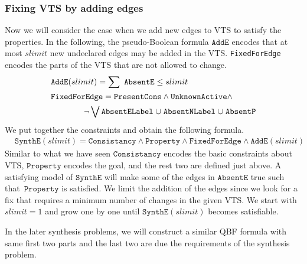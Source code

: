 \subsubsection{Fixing VTS by adding edges}
%
Now we will consider the case when we add new edges to VTS to satisfy the properties.
%
In the following, the pseudo-Boolean formula $\texttt{AddE}$ encodes
that at most $slimit$ new undeclared edges may be added in the VTS.
%
\texttt{FixedForEdge} encodes the parts of the VTS that are not allowed to change.
\begin{align*}
&\texttt{AddE}(slimit) = \sum~\texttt{AbsentE} \leq slimit\\
&\texttt{FixedForEdge} = \texttt{PresentCons} \land \texttt{UnknownActive} \land\\
& \quad\quad\quad\quad \lnot \bigvee \texttt{AbsentELabel} \;{\cup}\;
\texttt{AbsentNLabel} \;{\cup}\;
\texttt{AbsentP}
\end{align*}
We put together the constraints and obtain the following formula.
\begin{align*}
& \texttt{SynthE}(slimit) =
\texttt{Consistancy}\land \texttt{Property} \land
\texttt{FixedForEdge} \land
\texttt{AddE}(slimit)
\end{align*}
Similar to what we have seen $\texttt{Consistancy}$ encodes the basic constraints about VTS,
$\texttt{Property}$\; encodes the goal, and
the rest two are defined just above.
%
A satisfying model of $\texttt{SynthE}$ will make 
some of the edges in $\texttt{AbsentE}$ true such that~$\texttt{Property}$ is satisfied.
%
We limit the addition of the edges since we look for a fix that requires a minimum number
of changes in the given VTS.
%
We start with $slimit = 1$ and grow one by one until $\texttt{SynthE}(slimit)$
becomes satisfiable.

In the later synthesis problems, we will construct a similar QBF
formula with same first two parts and the last two are due the
requirements of the synthesis problem.
%
